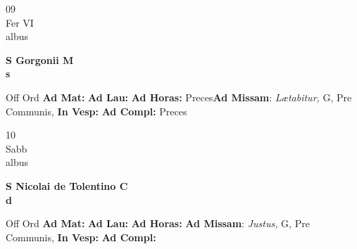 \documentclass[10pt, openany]{book}
\begin{document}
        \begin{center}
            \begin{minipage}{3.5in}
                \vspace{2em}
                \begin{minipage}{0.5in}
                    {\Huge 09} \\
                    {\normalsize Fer VI} \\
                    {\normalsize albus}
                \end{minipage}
                \begin{minipage}{3.0in}
                    \textbf{ \large S Gorgonii M \\
                    \textnormal{\normalsize s}} \\ 
                \end{minipage}
                \begin{justify}Off Ord
                    \textbf{Ad Mat: }
                    \textbf{Ad Lau: }
                    \textbf{Ad Horas: }Preces\textbf{Ad Missam}: \textit{Lætabitur,} G, Pre Communis,  
                    \textbf{In Vesp: }
                    \textbf{Ad Compl: }Preces
                \end{justify}
            \end{minipage}
        \end{center}
    
        \begin{center}
            \begin{minipage}{3.5in}
                \vspace{2em}
                \begin{minipage}{0.5in}
                    {\Huge 10} \\
                    {\normalsize Sabb} \\
                    {\normalsize albus}
                \end{minipage}
                \begin{minipage}{3.0in}
                    \textbf{ \large S Nicolai de Tolentino C \\
                    \textnormal{\normalsize d}} \\ 
                \end{minipage}
                \begin{justify}Off Ord
                    \textbf{Ad Mat: }
                    \textbf{Ad Lau: }
                    \textbf{Ad Horas: }\textbf{Ad Missam}: \textit{Justus,} G, Pre Communis,  
                    \textbf{In Vesp: }
                    \textbf{Ad Compl: }
                \end{justify}
            \end{minipage}
        \end{center}
    
\end{document}
